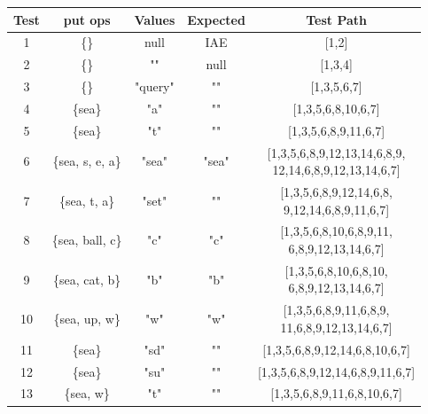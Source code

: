 \documentclass[12pt]{article}
\begin{document}
\begin{table}[htb]
\centering
\begin{tabular}{| c | c | c | c | c |} 
 \hline
 \textbf{Test} & \textbf{put ops} & \textbf{Values} & \textbf{Expected} & \textbf{Test Path} \\ \hline
 1             & \{\}              & null            & IAE               & [1,2]\\ \hline
 2             & \{\}              & ""              & null              & [1,3,4]\\ \hline
 3             & \{\}              & "query"         & ""                & [1,3,5,6,7]\\ \hline
 4             & \{sea\}           & "a"             & ""                & [1,3,5,6,8,10,6,7]\\ \hline
 5             & \{sea\}           & "t"             & ""                & [1,3,5,6,8,9,11,6,7]\\ \hline
 6             & \{sea, s, e, a\}  & "sea"           & "sea"             & \makecell{[1,3,5,6,8,9,12,13,14,6,8,9,\\ 12,14,6,8,9,12,13,14,6,7]}\\ \hline
 7             & \{sea, t, a\}     & "set"           & ""                & \makecell{[1,3,5,6,8,9,12,14,6,8,\\ 9,12,14,6,8,9,11,6,7]}\\ \hline
 8             & \{sea, ball, c\}  & "c"             & "c"               & \makecell{[1,3,5,6,8,10,6,8,9,11,\\ 6,8,9,12,13,14,6,7]}\\ \hline
 9             & \{sea, cat, b\}   & "b"             & "b"               & \makecell{[1,3,5,6,8,10,6,8,10,\\ 6,8,9,12,13,14,6,7]}\\ \hline
 10            & \{sea, up, w\}    & "w"             & "w"               & \makecell{[1,3,5,6,8,9,11,6,8,9,\\ 11,6,8,9,12,13,14,6,7]}\\ \hline
 11            & \{sea\}           & "sd"            & ""                & [1,3,5,6,8,9,12,14,6,8,10,6,7]\\ \hline
 12            & \{sea\}           & "su"            & ""                & [1,3,5,6,8,9,12,14,6,8,9,11,6,7]\\ \hline
 13            & \{sea, w\}        & "t"             & ""                & [1,3,5,6,8,9,11,6,8,10,6,7]\\ \hline
\end{tabular}
\end{table}
\end{document}
